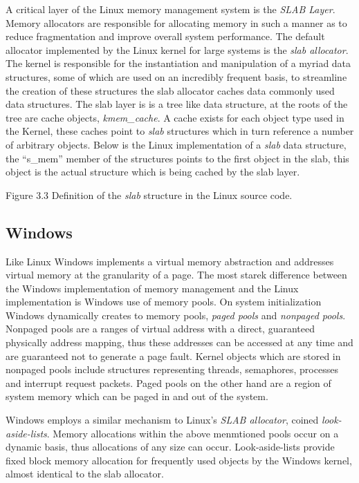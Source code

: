 	\normalfont \indent A critical layer of the Linux memory management system is the  \textit{SLAB Layer}. Memory allocators are responsible for allocating memory in such a manner as to reduce fragmentation and improve overall system performance. The default allocator implemented by the Linux kernel for large systems is the \textit{slab allocator}. The kernel is responsible for the instantiation and manipulation of a myriad data structures, some of which are used on an incredibly frequent basis, to streamline the creation of these structures the slab allocator caches data commonly used data structures. The slab layer is is a tree like data structure, at the roots of the tree are cache objects, \textit{kmem\_cache}. A cache exists for each object type used in the Kernel, these caches point to \textit{slab} structures which in turn reference a number of arbitrary objects. Below is the Linux implementation of a \textit{slab} data structure, the “s\_mem” member of the structures points to the first object in the slab, this object is the actual structure which is being cached by the slab layer. 
	
	 
\begin{center}
Figure 3.3 Definition of the \textit{slab} structure in the Linux source code. 
\end{center}

\subsection{\bf Windows}
	\normalfont \indent Like Linux Windows implements a virtual memory abstraction and addresses virtual memory at the granularity of a page. The most starek difference between the Windows implementation of memory management and the Linux implementation is Windows use of memory pools. On system initialization Windows dynamically creates to memory pools, \textit{paged pools} and \textit{nonpaged pools}\cite{windowsInternals}. Nonpaged pools are a ranges of virtual address with a direct, guaranteed physically address mapping, thus these addresses can be accessed at any time and are guaranteed not to generate a page fault. Kernel objects which are stored in nonpaged pools include structures representing threads, semaphores, processes and interrupt request packets. Paged pools on the other hand are a region of system memory which can be paged in and out of the system.

	\normalfont \indent Windows employs a similar mechanism to Linux’s \textit{SLAB allocator}, coined \textit{look-aside-lists}. Memory allocations within the above menmtioned pools occur on a dynamic basis, thus allocations of any size can occur\cite{windowsInternals}. Look-aside-lists provide fixed block memory allocation for frequently used objects by the Windows kernel, almost identical to the slab allocator.
	  
